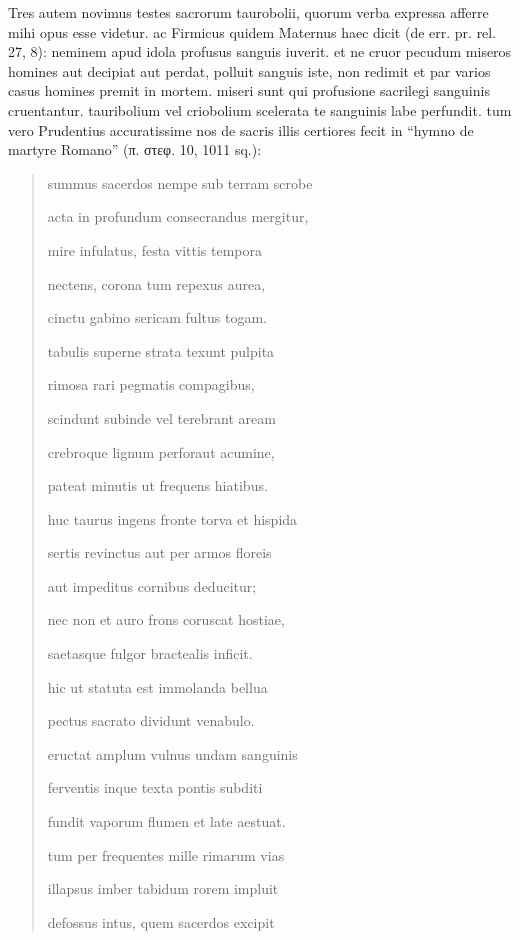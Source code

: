 \documentclass[a4paper, 11pt, oneside, polutonikogreek, german, twocolumn]{article}
\begin{document}
Tres autem novimus testes sacrorum taurobolii, quorum verba expressa afferre mihi opus esse videtur. ac Firmicus quidem Maternus haec dicit (de err. pr. rel. 27, 8): neminem apud idola profusus sanguis iuverit. et ne cruor pecudum miseros homines aut decipiat aut perdat, polluit sanguis iste, non redimit et par varios casus homines premit in mortem. miseri sunt qui profusione sacrilegi sanguinis cruentantur. tauribolium vel criobolium scelerata te sanguinis labe perfundit. tum vero Prudentius accuratissime nos de sacris illis certiores fecit in "`hymno de martyre Romano"' (π. στεφ. 10, 1011 sq.):
\begin{quotation}
summus sacerdos nempe sub terram scrobe

acta in profundum consecrandus mergitur,

mire infulatus, festa vittis tempora

nectens, corona tum repexus aurea,

cinctu gabino sericam fultus togam.

\bigskip

tabulis superne strata texunt pulpita

rimosa rari pegmatis compagibus,

scindunt subinde vel terebrant aream

crebroque lignum perforaut acumine,

pateat minutis ut frequens hiatibus.

\bigskip

huc taurus ingens fronte torva et hispida

sertis revinctus aut per armos floreis

aut impeditus cornibus deducitur;

nec non et auro frons coruscat hostiae,

saetasque fulgor bractealis inficit.

\bigskip

hic ut statuta est immolanda bellua

pectus sacrato dividunt venabulo.

eructat amplum vulnus undam sanguinis

ferventis inque texta pontis subditi

fundit vaporum flumen et late aestuat.

\bigskip

tum per frequentes mille rimarum vias

illapsus imber tabidum rorem impluit

defossus intus, quem sacerdos excipit


\end{quotation}
\end{document}
